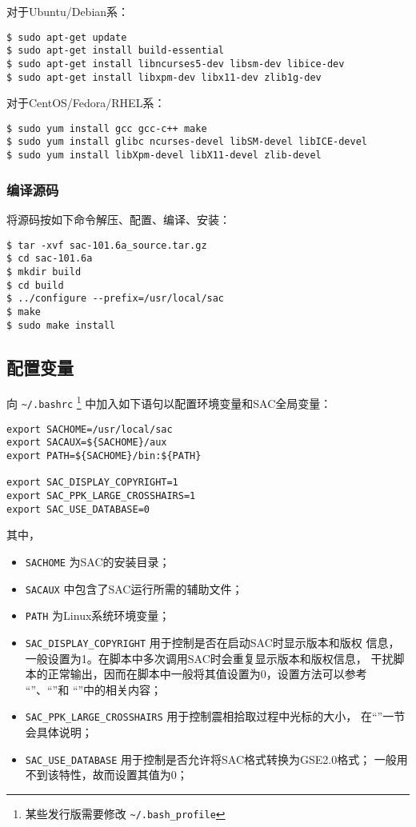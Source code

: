 对于Ubuntu/Debian系：
\begin{verbatim}
$ sudo apt-get update
$ sudo apt-get install build-essential
$ sudo apt-get install libncurses5-dev libsm-dev libice-dev
$ sudo apt-get install libxpm-dev libx11-dev zlib1g-dev
\end{verbatim}

对于CentOS/Fedora/RHEL系：
\begin{verbatim}
$ sudo yum install gcc gcc-c++ make
$ sudo yum install glibc ncurses-devel libSM-devel libICE-devel
$ sudo yum install libXpm-devel libX11-devel zlib-devel
\end{verbatim}

\subsubsection{编译源码}
将源码按如下命令解压、配置、编译、安装：
\begin{verbatim}
$ tar -xvf sac-101.6a_source.tar.gz
$ cd sac-101.6a
$ mkdir build
$ cd build
$ ../configure --prefix=/usr/local/sac
$ make
$ sudo make install
\end{verbatim}

\subsection{配置变量}
向 \verb|~/.bashrc| \footnote{某些发行版需要修改 \verb|~/.bash_profile|}
中加入如下语句以配置环境变量和SAC全局变量：
\begin{verbatim}
export SACHOME=/usr/local/sac
export SACAUX=${SACHOME}/aux
export PATH=${SACHOME}/bin:${PATH}

export SAC_DISPLAY_COPYRIGHT=1
export SAC_PPK_LARGE_CROSSHAIRS=1
export SAC_USE_DATABASE=0
\end{verbatim}

其中，
\begin{itemize}
\item \texttt{SACHOME} 为SAC的安装目录；
\item \texttt{SACAUX} 中包含了SAC运行所需的辅助文件；
\item \texttt{PATH} 为Linux系统环境变量；
\item \verb|SAC_DISPLAY_COPYRIGHT| 用于控制是否在启动SAC时显示版本和版权
    信息，一般设置为1。在脚本中多次调用SAC时会重复显示版本和版权信息，
    干扰脚本的正常输出，因而在脚本中一般将其值设置为0，设置方法可以参考
    ``''、``''和
    ``''中的相关内容；
\item \verb|SAC_PPK_LARGE_CROSSHAIRS| 用于控制震相拾取过程中光标的大小，
    在``''一节会具体说明；
\item \verb|SAC_USE_DATABASE| 用于控制是否允许将SAC格式转换为GSE2.0格式；
    一般用不到该特性，故而设置其值为0；
\end{itemize}

